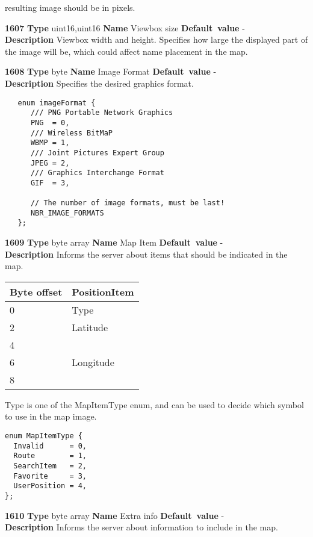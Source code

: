 \documentclass[a4paper]{article}
\begin{document}
\begin{list}{\textbf{ParamID}}{}
  resulting image should be in pixels.
\item \textbf{1607} \textbf{Type} uint16,uint16 \textbf{Name} Viewbox size
                 \textbf{Default~value} - \\
  \label{Viewbox size}
  \textbf{Description} Viewbox width and height. Specifies how large the
  displayed part of the image will be, which could affect name placement
  in the map.
\item \textbf{1608} \textbf{Type} byte \textbf{Name} Image Format
                 \textbf{Default~value} - \\
  \label{Image Format}
  \textbf{Description} Specifies the desired graphics format.
\begin{verbatim}
   enum imageFormat {
      /// PNG Portable Network Graphics
      PNG  = 0,
      /// Wireless BitMaP
      WBMP = 1,
      /// Joint Pictures Expert Group
      JPEG = 2,
      /// Graphics Interchange Format
      GIF  = 3,

      // The number of image formats, must be last!
      NBR_IMAGE_FORMATS
   };
\end{verbatim}
\item \textbf{1609} \textbf{Type} byte array \textbf{Name} Map Item
                 \textbf{Default~value} - \\
  \label{Map Item}
  \textbf{Description} Informs the server about items that should be
  indicated in the map.

\begin{tabular}{|l|l|}\hline
Byte offset & PositionItem \\\hline
0           & Type         \\\hline
2           & Latitude     \\
4           &              \\\hline
6           & Longitude    \\
8           &              \\\hline
\end{tabular}

Type is one of the MapItemType enum, and can be used to decide which
symbol to use in the map image.
\begin{verbatim}
enum MapItemType {
  Invalid      = 0,
  Route        = 1, 
  SearchItem   = 2,
  Favorite     = 3,
  UserPosition = 4,
};
\end{verbatim}
\item \textbf{1610} \textbf{Type} byte array \textbf{Name} Extra info
                 \textbf{Default~value} - \\
  \label{Extra info}
  \textbf{Description} Informs the server about information to include
  in the map.


\end{list}
\end{document}
